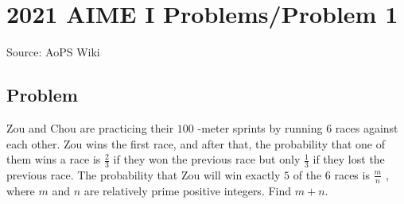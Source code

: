 \documentclass[12pt]{article}
\begin{document}
\section*{{2021 AIME I Problems/Problem 1}}
Source: AoPS Wiki

\subsection*{Problem}
Zou and Chou are practicing their $100$ -meter sprints by running $6$ races against each other. Zou wins the first race, and after that, the probability that one of them wins a race is $\frac23$ if they won the previous race but only $\frac13$ if they lost the previous race. The probability that Zou will win exactly $5$ of the $6$ races is $\frac mn$ , where $m$ and $n$ are relatively prime positive integers. Find $m+n.$
\end{document}

